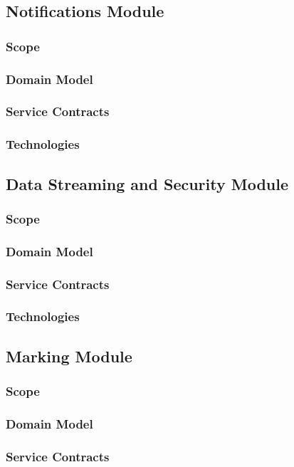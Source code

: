 \documentclass{article}
\begin{document}
	\subsection{Notifications Module}
		\subsubsection{Scope}
		\subsubsection{Domain Model}
		\subsubsection{Service Contracts}
		\subsubsection{Technologies}
		
	\subsection{Data Streaming and Security Module}
		\subsubsection{Scope}
		\subsubsection{Domain Model}
		\subsubsection{Service Contracts}
		\subsubsection{Technologies}

	\subsection{Marking Module}
		\subsubsection{Scope}
		\subsubsection{Domain Model}
		\subsubsection{Service Contracts}
\end{document}
